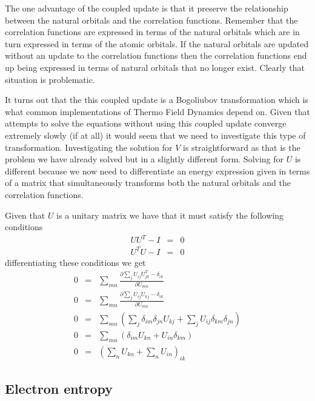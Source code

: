 \documentclass[pra]{revtex4-1}
\begin{document}
The one advantage of the coupled update is that it preserve the relationship
between the natural orbitals and the correlation functions. Remember that the
correlation functions are expressed in terms of the natural orbitals which are
in turn expressed in terms of the atomic orbitals. If the natural orbitals are
updated without an update to the correlation functions then the correlation
functions end up being expressed in terms of natural orbitals that no longer
exist. Clearly that situation is problematic.

It turns out that the this coupled update is a Bogoliubov transformation which is
what common implementations of Thermo Field Dynamics depend on. Given that attempts
to solve the equations without using this coupled update converge extremely 
slowly (if at all) it would seem that we need to investigate this type of
transformation. Investigating the solution for $V$ is straightforward as that is
the problem we have already solved but in a slightly different form. Solving 
for $U$ is different because we now need to differentiate an energy expression
given in terms of a matrix that simultaneously transforms both the natural orbitals
and the correlation functions. 

Given that $U$ is a unitary matrix we have that it must satisfy the following
conditions
\begin{eqnarray}
   UU^T-I &=& 0 \\
   U^TU-I &=& 0
\end{eqnarray}
differentiating these conditions we get
\begin{eqnarray}
  0 &=& \sum_{mn}\frac{\partial\sum_{j}U_{ij}U^T_{jk}-\delta_{ik}}{\partial U_{mn}} \\
  0 &=& \sum_{mn}\frac{\partial\sum_{j}U_{ij}U_{kj}-\delta_{ik}}{\partial U_{mn}} \\
  0 &=& \sum_{mn}\left(\sum_{j}\delta_{im}\delta_{jn}U_{kj}
                      +\sum_{j}U_{ij}\delta_{km}\delta_{jn}\right) \\
  0 &=& \sum_{mn}\left(\delta_{im}U_{kn}+U_{in}\delta_{km}\right) \\
  0 &=& \left(\sum_n U_{kn}+\sum_n U_{in}\right)_{ik} 
\end{eqnarray}

\subsection{Electron entropy}
\end{document}
